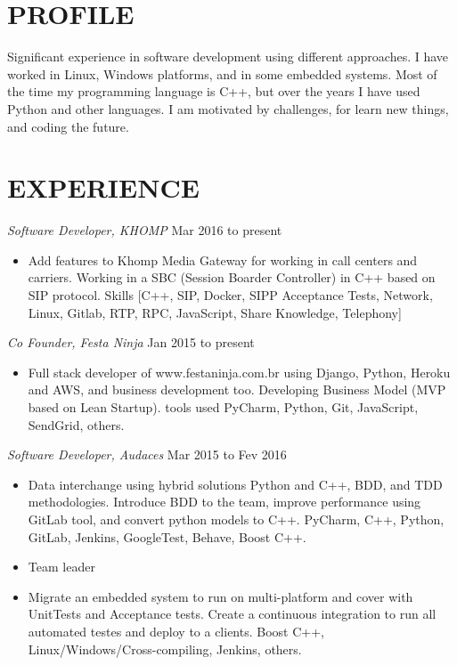 \documentclass[line,margin]{res}
\begin{document}
\address{alvarofleith@gmail.com or +64 (09) 889-3534}
\address{https://linkedin.com/in/alvarofleith}


\begin{resume}

\section{PROFILE}       Significant experience in software development using different approaches. I have worked in Linux, Windows platforms, and in some embedded systems. Most of the time my programming language is C++, but over the years I have used Python and other languages. I am motivated by challenges, for learn new things, and coding the future.


 \section{EXPERIENCE} {\sl Software Developer, KHOMP} \hfill Mar 2016 to present \\
                 \begin{itemize}  \itemsep -2pt
                 \item Add features to Khomp Media Gateway for working in call centers and carriers. Working in a SBC (Session Boarder Controller) in C++ based on SIP protocol. Skills [C++, SIP, Docker, SIPP Acceptance Tests, Network, Linux, Gitlab, RTP, RPC, JavaScript, Share Knowledge, Telephony]
                \end{itemize}

                {\sl Co Founder, Festa Ninja} \hfill Jan 2015 to present \\
                 \begin{itemize}  \itemsep -2pt
                 \item Full stack developer of www.festaninja.com.br using Django, Python, Heroku and AWS, and business development too. Developing Business Model (MVP based on Lean Startup). tools used PyCharm, Python, Git, JavaScript, SendGrid, others.
                 \end{itemize}

                {\sl Software Developer, Audaces} \hfill Mar 2015 to Fev 2016 \\
                  \begin{itemize}
                   \item Data interchange using hybrid solutions Python and C++, BDD, and TDD methodologies. Introduce BDD to the team, improve performance using GitLab tool, and convert python models to C++. PyCharm, C++, Python, GitLab, Jenkins, GoogleTest, Behave, Boost C++.
                   \item Team leader
                   \item Migrate an embedded system to run on multi-platform and cover with UnitTests and Acceptance tests. Create a continuous integration to run all automated testes and deploy to a clients. Boost C++, Linux/Windows/Cross-compiling, Jenkins, others.
                   \end{itemize}


\end{resume}
\end{document}
